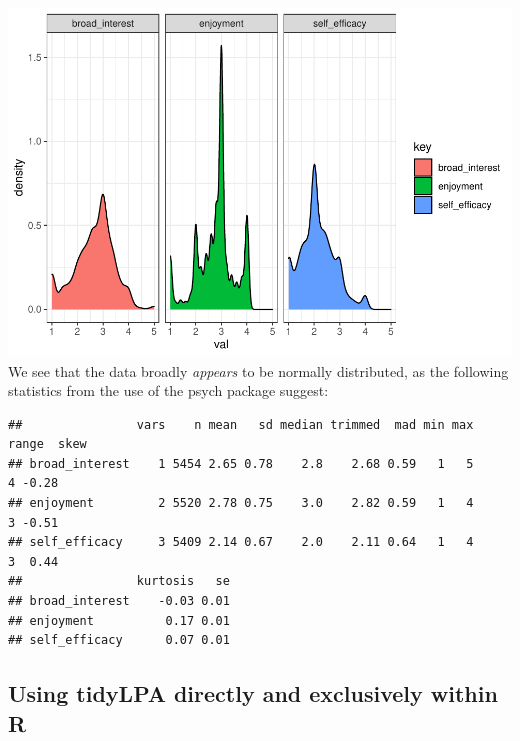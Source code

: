 \documentclass[english,man]{apa6}
\newenvironment{Shaded}{\begin{snugshade}}{\end{snugshade}}
\newcommand{\KeywordTok}[1]{\textcolor[rgb]{0.13,0.29,0.53}{\textbf{#1}}}
\newcommand{\NormalTok}[1]{#1}
\newcommand{\OperatorTok}[1]{\textcolor[rgb]{0.81,0.36,0.00}{\textbf{#1}}}
\newcommand{\StringTok}[1]{\textcolor[rgb]{0.31,0.60,0.02}{#1}}
\begin{document}
\includegraphics{paper_files/figure-latex/unnamed-chunk-6-1.pdf}
We see that the data broadly \emph{appears} to be normally distributed, as the following statistics from the use of the psych package suggest:

\begin{Shaded}
\end{Shaded}

\begin{verbatim}
##                vars    n mean   sd median trimmed  mad min max range  skew
## broad_interest    1 5454 2.65 0.78    2.8    2.68 0.59   1   5     4 -0.28
## enjoyment         2 5520 2.78 0.75    3.0    2.82 0.59   1   4     3 -0.51
## self_efficacy     3 5409 2.14 0.67    2.0    2.11 0.64   1   4     3  0.44
##                kurtosis   se
## broad_interest    -0.03 0.01
## enjoyment          0.17 0.01
## self_efficacy      0.07 0.01
\end{verbatim}

\hypertarget{using-tidylpa-directly-and-exclusively-within-r}{%
\subsection{Using tidyLPA directly and exclusively within R}\label{using-tidylpa-directly-and-exclusively-within-r}}
\end{document}
